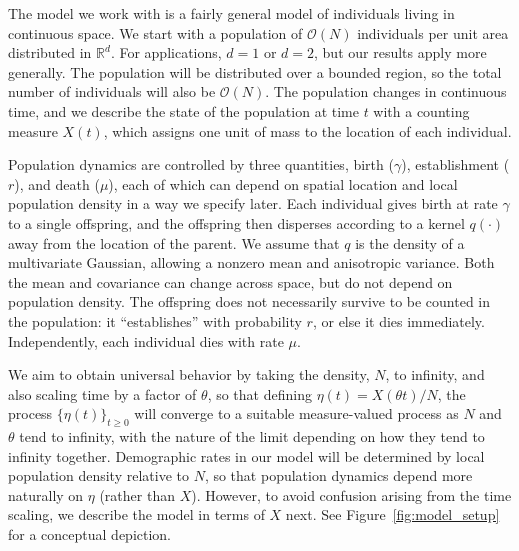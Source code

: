 \documentclass[12pt]{article}
\newcommand{\bigO}{\mathcal{O}}
\begin{document}
The model we work with is a fairly general model
of individuals living in continuous space.
We start with a population of
$\bigO(N)$ individuals per unit area distributed in $\mathbb{R}^d$.
For applications, $d=1$ or $d=2$, but our results apply more generally.
The population will be distributed over a bounded region,
so the total number of individuals will also be $\bigO(N)$.
The population changes in continuous time, and
we describe the state of the population at time $t$ with a counting measure $X(t)$,
which assigns one unit of mass to the location of each individual.

Population dynamics are controlled by three quantities,
birth ($\gamma$), establishment ($r$), and death ($\mu$),
each of which can depend on spatial location and local population density
in a way we specify later.
Each individual gives birth at rate $\gamma$ to a single offspring,
and the offspring
then disperses according to a kernel $q(\cdot)$ away from the location of the parent.
We assume that $q$ is the density of a multivariate Gaussian,
allowing a nonzero mean and anisotropic variance.
Both the mean and covariance can change across space,
but do not depend on population density.
The offspring does not necessarily survive to be counted in the population:
it ``establishes'' with probability $r$,
or else it dies immediately.
Independently, each individual dies with rate $\mu$.

We aim to obtain universal behavior by taking the density, $N$, to infinity,
and also scaling time by a factor of $\theta$,
so that defining $\eta(t) = X(\theta t) / N$,
the process $\{\eta(t)\}_{t \ge 0}$
will converge to a suitable measure-valued process
as $N$ and $\theta$ tend to infinity,
with the nature of the limit depending on how they tend to infinity together.
Demographic rates in our model
will be determined by local population density relative to $N$,
so that population dynamics depend more naturally on $\eta$ (rather than $X$).
However, to avoid confusion arising from the time scaling,
we describe the model in terms of $X$ next.
See Figure~\ref{fig:model_setup} for a conceptual depiction.
\end{document}
